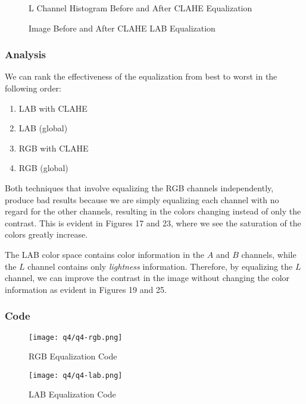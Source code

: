 \documentclass[12pt, letterpaper]{article}
\begin{document}
\begin{figure}[H]
    \centering
    \qquad
    \caption{L Channel Histogram Before and After CLAHE Equalization}%
\end{figure}

\begin{figure}[H]
    \centering
    \qquad
    \caption{Image Before and After CLAHE LAB Equalization}%
\end{figure}

\subsubsection{Analysis}

We can rank the effectiveness of the equalization from best to worst in the following order:
\begin{enumerate}
  \item LAB with CLAHE
  \item LAB (global)
  \item RGB with CLAHE
  \item RGB (global)
\end{enumerate}

Both techniques that involve equalizing the RGB channels independently, produce bad results because we are simply equalizing each channel with no regard for the other channels, resulting in the colors changing instead of only the contrast. This is evident in Figures 17 and 23, where we see the saturation of the colors greatly increase.

The LAB color space contains color information in the $A$ and $B$ channels, while the $L$ channel contains only \textit{lightness} information. Therefore, by equalizing the $L$ channel, we can improve the contrast in the image without changing the color information as evident in Figures 19 and 25. 

\subsubsection{Code}

\begin{figure}[H]
    \centering
    \texttt{[image: q4/q4-rgb.png]}
    \caption{RGB Equalization Code}
\end{figure}

\begin{figure}[H]
    \centering
    \texttt{[image: q4/q4-lab.png]}
    \caption{LAB Equalization Code}
\end{figure}
\end{document}
